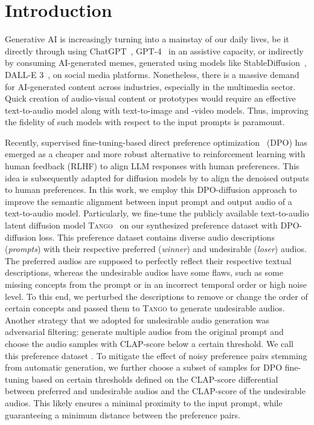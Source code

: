 \section{Introduction}

Generative AI is increasingly turning into a mainstay of our daily lives, be it directly through using ChatGPT~\cite{chatgpt}, GPT-4~\cite{gpt4} in an assistive capacity, or indirectly by consuming AI-generated memes, generated using models like StableDiffusion~\cite{rombach2022high}, DALL-E 3~\cite{dalle2,BetkerImprovingIG}, on social media platforms. Nonetheless, there is a massive demand for AI-generated content across industries, especially in the multimedia sector. Quick creation of audio-visual content or prototypes would require an effective text-to-audio model along with text-to-image and -video models. Thus, improving the fidelity of such models with respect to the input prompts is paramount.

Recently, supervised fine-tuning-based direct preference optimization~\cite{rafailov2023direct} (DPO) has emerged as a cheaper and more robust alternative to reinforcement learning with human feedback (RLHF) to align LLM responses with human preferences. This idea is subsequently adapted for diffusion models by \citet{wallace2023diffusion} to align the denoised outputs to human preferences. In this work, we employ this DPO-diffusion approach to improve the semantic alignment between input prompt and output audio of a text-to-audio model. Particularly, we fine-tune the publicly available text-to-audio latent diffusion model \textsc{Tango}~\cite{ghosal2023text} on our synthesized preference dataset with DPO-diffusion loss. This preference dataset contains diverse audio descriptions (\emph{prompts}) with their respective preferred (\emph{winner}) and undesirable (\emph{loser}) audios. The preferred audios are supposed to perfectly reflect their respective textual descriptions, whereas the undesirable audios have some flaws, such as some missing concepts from the prompt or in an incorrect temporal order or high noise level. To this end, we perturbed the descriptions to remove or change the order of certain concepts and passed them to \textsc{Tango} to generate undesirable audios. Another strategy that we adopted for undesirable audio generation was adversarial filtering: generate multiple audios from the original prompt and choose the audio samples with CLAP-score below a certain threshold. We call this preference dataset \dataset{}. To mitigate the effect of noisy preference pairs stemming from automatic generation, we further choose a subset of samples for DPO fine-tuning based on certain thresholds defined on the CLAP-score differential between preferred and undesirable audios and the CLAP-score of the undesirable audios. This likely ensures a minimal proximity to the input prompt, while guaranteeing a minimum distance between the preference pairs.

